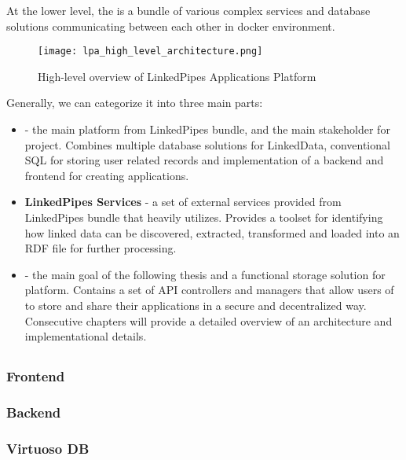 At the lower level, the \lpa{} is a bundle of various complex services and database solutions communicating between each other in docker environment. 

\begin{figure}[h]
    \centering
    \texttt{[image: lpa\_high\_level\_architecture.png]}
    \caption{High-level overview of LinkedPipes Applications Platform}
    \label{fig:lpa-high-level-arch}
\end{figure}

Generally, we can categorize it into three main parts: 

\begin{itemize}
    \item \textbf{\lpa{}} - the main platform from LinkedPipes bundle, and the main stakeholder for \lpas{} project. Combines multiple database solutions for LinkedData, conventional SQL for storing user related records and implementation of a backend and frontend for creating applications.
    \item \textbf{LinkedPipes Services} - a set of external services provided from LinkedPipes bundle that \lpa{} heavily utilizes. Provides a toolset for identifying how linked data can be discovered, extracted, transformed and loaded into an RDF file for further processing.
    \item \textbf{\lpas{}} - the main goal of the following thesis and a functional storage solution for \lpa{} platform. Contains a set of API controllers and managers that allow users of \lpa{} to store and share their applications in a secure and decentralized way. Consecutive chapters will provide a detailed overview of an architecture and implementational details.
\end{itemize}

\subsection{\lpa{}}

\subsubsection{Frontend}

\subsubsection{Backend}

\subsubsection{Virtuoso DB}

